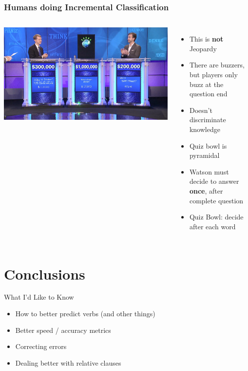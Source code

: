 \documentclass[compress]{beamer}
\begin{document}
\begin{frame}
	\frametitle{Humans doing Incremental Classification}

	\begin{columns}

		\includegraphics[width=1.0\linewidth]{qb/jeopardy}


		\begin{itemize}
			\item This is {\bf not} Jeopardy \cite{ferruci-10}
			\item There are buzzers, but players only buzz
                          at the question end
			\item Doesn't discriminate knowledge
			\item Quiz bowl is pyramidal
                        \item Watson must decide to answer {\bf once}, after
                          complete question
                        \item Quiz Bowl: decide after each word
		\end{itemize}

	\end{columns}

\end{frame}




\section{Conclusions}

\begin{frame}{What I'd Like to Know}

  \begin{itemize}
    \item How to better predict verbs (and other things)
    \item Better speed / accuracy metrics
    \item Correcting errors
    \item Dealing better with relative clauses
  \end{itemize}

\end{frame}
\end{document}
